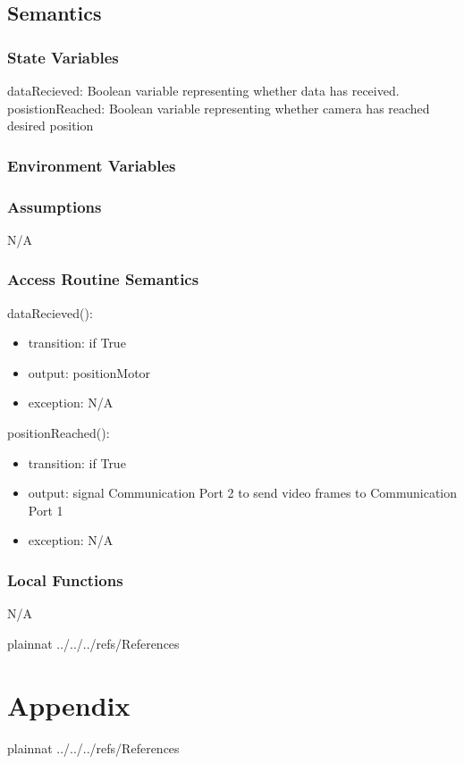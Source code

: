 \documentclass[12pt, titlepage]{article}
\begin{document}
\subsection{Semantics}

\subsubsection{State Variables}

dataRecieved: Boolean variable representing whether data has received. \\
posistionReached: Boolean variable representing whether camera has reached desired position
\subsubsection{Environment Variables}



\subsubsection{Assumptions}

N/A

\subsubsection{Access Routine Semantics}

\noindent dataRecieved():
\begin{itemize}
\item transition: if True 
\item output: positionMotor 
\item exception: N/A 
\end{itemize}

\noindent positionReached():
\begin{itemize}
\item transition: if True 
\item output: signal Communication Port 2 to send video frames to Communication Port 1 
\item exception: N/A 
\end{itemize}




\subsubsection{Local Functions}

N/A

\newpage

 {plainnat}
 {../../../refs/References}

\newpage





\section{Appendix} \label{Appendix}



\newpage

 {plainnat}
 {../../../refs/References}

\newpage
\end{document}
